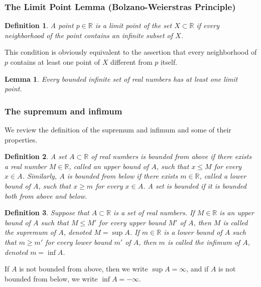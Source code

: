 \documentclass[a4paper,12pt]{article} %
\newtheorem{definition}{Definition}[section]
\newtheorem{lemma}[theorem]{Lemma}
\begin{document}
\subsubsection{The Limit Point Lemma (Bolzano-Weierstras Principle)}
\begin{definition}
    A point $p\in \mathbb{R}$ is a \textit{limit point} of the set $X \subset \mathbb{R} $
    if every neighborhood of the point contains an infinite subset of $X$.
\end{definition}

    This condition is obviously equivalent to the assertion that 
    every neighborhood of $p$ contains at least one point of $X$ different from 
    $p$ itself.

\begin{lemma}
    Every bounded infinite set of real numbers has at least one limit point.
\end{lemma}

\subsubsection{The supremum and infimum}
We review the definition of the supremum and infimum and 
some of their properties.

\begin{definition}
    A set $A \subset \mathbb{R}$ of real numbers is bounded from 
    above if there exists a real number $M \in \mathbb{R}$, 
    called an upper bound of $A$, such that $x \le M$ for 
    every $x \in A$. Similarly, $A$ is bounded from below if 
    there exists $m \in \mathbb{R}$, called a lower bound of 
    $A$, such that $x \ge m$ for every $x \in A$. A set is bounded 
    if it is bounded both from above and below.
\end{definition}

\begin{definition}
    Suppose that $A \subset \mathbb{R}$ is a set of real numbers. If
    $M \in \mathbb{R}$ is an upper bound of $A$ such that $M \le M'$ for 
    every upper bound $M'$ of $A$, then $M$ is called the supremum of 
    $A$, denoted $M = \sup A$. If $m \in \mathbb{R}$ is a lower bound 
    of $A$ such that $m \ge m'$ for every lower bound $m'$ of $A$, then 
    $m$ is called the infimum of $A$, denoted $m = \inf A$.
\end{definition}

If $A$ is not bounded from above, then we write $\sup A = \infty$, 
and if $A$ is not bounded from below, we write $\inf A = -\infty$.
\end{document}
